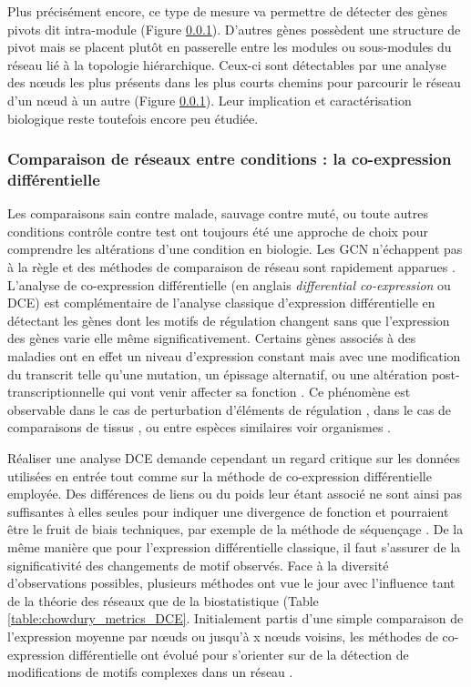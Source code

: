 Plus précisément encore, ce type de mesure va permettre de détecter des gènes pivots dit intra-module (Figure \ref{}). D'autres gènes possèdent une structure de pivot mais se placent plutôt en passerelle entre les modules ou sous-modules du réseau lié à la topologie hiérarchique. Ceux-ci sont détectables par une analyse des nœuds les plus présents dans les plus courts chemins pour parcourir le réseau d'un nœud à un autre (Figure \ref{}). Leur implication et caractérisation biologique reste toutefois encore peu étudiée.



\subsubsection{Comparaison de réseaux entre conditions : la co-expression différentielle}

Les comparaisons sain contre malade, sauvage contre muté, ou toute autres conditions contrôle contre test ont toujours été une approche de choix pour comprendre les altérations d'une condition en biologie. Les \acrshort{GCN} n'échappent pas à la règle et des méthodes de comparaison de réseau sont rapidement apparues \cite{Lai2004Nov}. L'analyse de co-expression différentielle (en anglais \textit{differential co-expression} ou DCE) est complémentaire de l'analyse classique d'expression différentielle en détectant les gènes dont les motifs de régulation changent sans que l'expression des gènes varie elle même significativement. Certains gènes associés à des maladies ont en effet un niveau d'expression constant mais avec une modification du transcrit telle qu'une mutation, un épissage alternatif, ou une altération post-transcriptionnelle qui vont venir affecter sa fonction \cite{delaFuente2010Jul}. Ce phénomène est observable dans le cas de perturbation d'éléments de régulation \cite{Rotival2013}, dans le cas de comparaisons de tissus \cite{Gov2017}, ou entre espèces similaires voir organismes \cite{Chowdhury2019}.


Réaliser une analyse DCE demande cependant un regard critique sur les données utilisées en entrée tout comme sur la méthode de co-expression différentielle employée. Des différences de liens ou du poids leur étant associé ne sont ainsi pas suffisantes à elles seules pour indiquer une divergence de fonction et pourraient être le fruit de biais techniques, par exemple de la méthode de séquençage \cite{Southworth2009}. De la même manière que pour l'expression différentielle classique, il faut s'assurer de la significativité des changements de motif observés. Face à la diversité d'observations possibles, plusieurs méthodes ont vue le jour avec l'influence tant de la théorie des réseaux que de la biostatistique (Table \ref{table:chowdury_metrics_DCE}. Initialement partis d'une simple comparaison de l'expression moyenne par nœuds ou jusqu'à x nœuds voisins, les méthodes de co-expression différentielle ont évolué pour s'orienter sur de la détection de modifications de motifs complexes dans un réseau \cite{delaFuente2010Jul}. 

